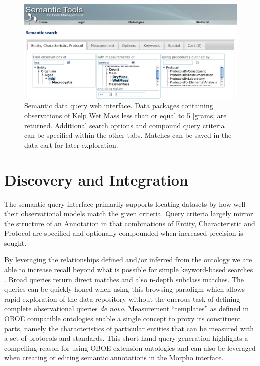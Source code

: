 \begin{figure}[!t]
\centering
\includegraphics[width=1.0\textwidth]{images/metacat-query.png}
\caption{Semantic data query web interface. Data packages containing observations of Kelp Wet Mass less than or equal to 5 [grams] are returned. Additional search options and compound query criteria can be specified within the other tabs. Matches can be saved in the data cart for later exploration.}
\label{fig:metacat-query}
\end{figure}


\section{Discovery and Integration}
\label{sec:application}

 The semantic query interface primarily supports locating datasets by how well their observational models match the given criteria. Query criteria largely mirror the structure of an Annotation in that combinations of Entity, Characteristic and Protocol are specified and optionally compounded when increased precision is sought. 

By leveraging the relationships defined and/or inferred from the
ontology we are able to increase recall beyond what is possible for
simple keyword-based searches
\cite{berkley09:_improv_data_discov_for_metad}. Broad queries return
direct matches and also n-depth subclass matches. The queries can be
quickly honed when using this browsing paradigm which allows rapid
exploration of the data repository without the onerous task of defining
complete observational queries \emph{de novo}. Measurement ``templates''
as defined in OBOE compatible ontologies enable a single concept to
proxy its constituent parts, namely the characteristics of
particular entities that can be measured with a set of protocols and
standards. This short-hand query generation highlights a
compelling reason for using OBOE extension ontologies and can
also be leveraged when creating or editing semantic annotations in the Morpho interface.  

